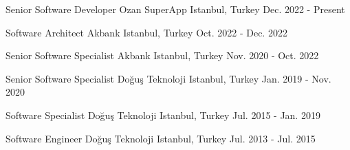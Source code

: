 

\begin{cventries}

  \cventry
    {Senior Software Developer} %
    {Ozan SuperApp} %
    {Istanbul, Turkey} %
    {Dec. 2022 - Present} %
    {}

  \cventry
    {Software Architect} %
    {Akbank} %
    {Istanbul, Turkey} %
    {Oct. 2022 - Dec. 2022} %
    {}

  \cventry
    {Senior Software Specialist} %
    {Akbank} %
    {Istanbul, Turkey} %
    {Nov. 2020 - Oct. 2022} %
    {}

  \cventry
    {Senior Software Specialist} %
    {Doğuş Teknoloji} %
    {Istanbul, Turkey} %
    {Jan. 2019 - Nov. 2020} %
    {}

  \cventry
    {Software Specialist} %
    {Doğuş Teknoloji} %
    {Istanbul, Turkey} %
    {Jul. 2015 - Jan. 2019} %
    {}

  \cventry
    {Software Engineer} %
    {Doğuş Teknoloji} %
    {Istanbul, Turkey} %
    {Jul. 2013 - Jul. 2015} %
    {}

\end{cventries}
